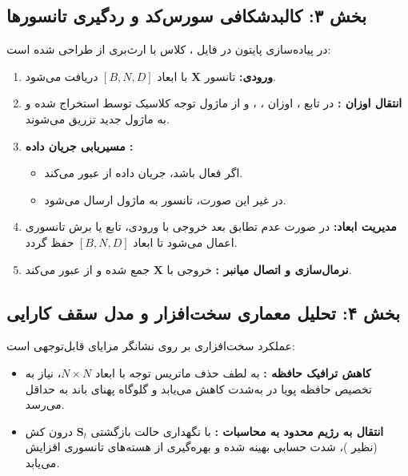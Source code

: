 \subsection*{بخش ۳: کالبدشکافی سورس‌کد و ردگیری تانسورها }
در پیاده‌سازی پایتون در فایل ، کلاس  با ارث‌بری از  طراحی شده است:
\begin{enumerate}
\item \textbf{ورودی:} تانسور $\mathbf{X}$ با ابعاد $[B, N, D]$ دریافت می‌شود.
\item \textbf{انتقال اوزان :} در تابع ، اوزان ، ،  و  از ماژول توجه کلاسیک توسط  استخراج شده و به ماژول جدید تزریق می‌شوند.
\item \textbf{مسیریابی جریان داده :}
\begin{itemize}
\item اگر  فعال باشد، جریان داده از  عبور می‌کند.
\item در غیر این صورت، تانسور به ماژول  ارسال می‌شود.
\end{itemize}
\item \textbf{مدیریت ابعاد:} در صورت عدم تطابق بعد خروجی با ورودی، تابع  یا برش تانسوری  اعمال می‌شود تا ابعاد $[B, N, D]$ حفظ گردد.
\item \textbf{نرمال‌سازی و اتصال میانبر :} خروجی با $\mathbf{X}$ جمع شده و از  عبور می‌کند.
\end{enumerate}

\subsection*{بخش ۴: تحلیل معماری سخت‌افزار و مدل سقف کارایی }
عملکرد سخت‌افزاری بر روی  نشانگر مزایای قابل‌توجهی است:
\begin{itemize}
\item \textbf{کاهش ترافیک حافظه :} به لطف حذف ماتریس توجه  با ابعاد $N \times N$، نیاز به تخصیص حافظه پویا در  به‌شدت کاهش می‌یابد و گلوگاه پهنای باند  به حداقل می‌رسد.
\item \textbf{انتقال به رژیم محدود به محاسبات :} با نگهداری حالت بازگشتی $\mathbf{S}_t$ درون کش  (نظیر )، شدت حسابی  بهینه شده و بهره‌گیری از هسته‌های تانسوری  افزایش می‌یابد.
\end{itemize}

